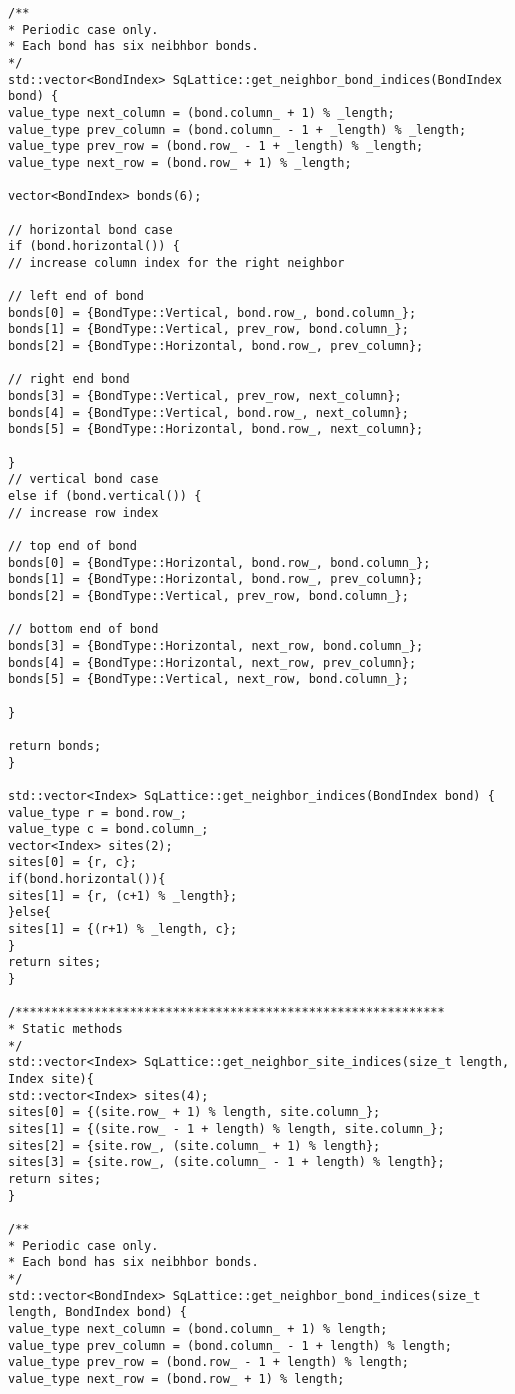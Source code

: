 \begin{lstlisting}[style=CStyle]
/**
* Periodic case only.
* Each bond has six neibhbor bonds.
*/
std::vector<BondIndex> SqLattice::get_neighbor_bond_indices(BondIndex bond) {
value_type next_column = (bond.column_ + 1) % _length;
value_type prev_column = (bond.column_ - 1 + _length) % _length;
value_type prev_row = (bond.row_ - 1 + _length) % _length;
value_type next_row = (bond.row_ + 1) % _length;

vector<BondIndex> bonds(6);

// horizontal bond case
if (bond.horizontal()) {
// increase column index for the right neighbor

// left end of bond
bonds[0] = {BondType::Vertical, bond.row_, bond.column_};
bonds[1] = {BondType::Vertical, prev_row, bond.column_};
bonds[2] = {BondType::Horizontal, bond.row_, prev_column};

// right end bond
bonds[3] = {BondType::Vertical, prev_row, next_column};
bonds[4] = {BondType::Vertical, bond.row_, next_column};
bonds[5] = {BondType::Horizontal, bond.row_, next_column};

}
// vertical bond case
else if (bond.vertical()) {
// increase row index

// top end of bond
bonds[0] = {BondType::Horizontal, bond.row_, bond.column_};
bonds[1] = {BondType::Horizontal, bond.row_, prev_column};
bonds[2] = {BondType::Vertical, prev_row, bond.column_};

// bottom end of bond
bonds[3] = {BondType::Horizontal, next_row, bond.column_};
bonds[4] = {BondType::Horizontal, next_row, prev_column};
bonds[5] = {BondType::Vertical, next_row, bond.column_};

}

return bonds;
}

std::vector<Index> SqLattice::get_neighbor_indices(BondIndex bond) {
value_type r = bond.row_;
value_type c = bond.column_;
vector<Index> sites(2);
sites[0] = {r, c};
if(bond.horizontal()){
sites[1] = {r, (c+1) % _length};
}else{
sites[1] = {(r+1) % _length, c};
}
return sites;
}

/************************************************************
* Static methods
*/
std::vector<Index> SqLattice::get_neighbor_site_indices(size_t length, Index site){
std::vector<Index> sites(4);
sites[0] = {(site.row_ + 1) % length, site.column_};
sites[1] = {(site.row_ - 1 + length) % length, site.column_};
sites[2] = {site.row_, (site.column_ + 1) % length};
sites[3] = {site.row_, (site.column_ - 1 + length) % length};
return sites;
}

/**
* Periodic case only.
* Each bond has six neibhbor bonds.
*/
std::vector<BondIndex> SqLattice::get_neighbor_bond_indices(size_t length, BondIndex bond) {
value_type next_column = (bond.column_ + 1) % length;
value_type prev_column = (bond.column_ - 1 + length) % length;
value_type prev_row = (bond.row_ - 1 + length) % length;
value_type next_row = (bond.row_ + 1) % length;


\end{lstlisting}
